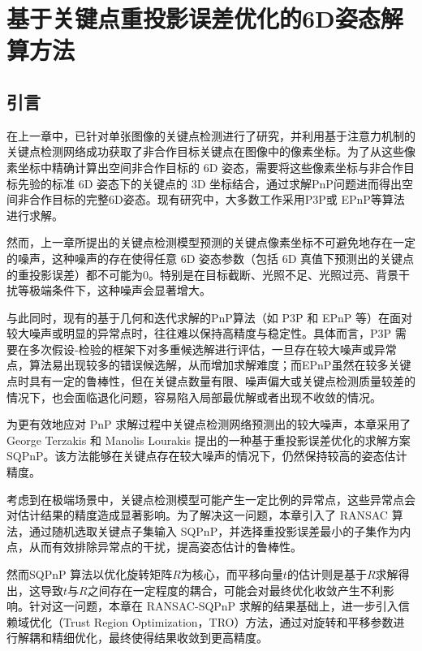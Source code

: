 
\chapter{基于关键点重投影误差优化的6D姿态解算方法}
\label{chap:RANSAC-TRO-SQPnP}

\section{引言}
\label{sec:RANSAC-TRO-SQPnP:intro}
在上一章中，已针对单张图像的关键点检测进行了研究，并利用基于注意力机制的关键点检测网络成功获取了非合作目标关键点在图像中的像素坐标。为了从这些像素坐标中精确计算出空间非合作目标的 6D 姿态，需要将这些像素坐标与非合作目标先验的标准 6D 姿态下的关键点的 3D 坐标结合，通过求解PnP问题进而得出空间非合作目标的完整6D姿态。现有研究中，大多数工作采用P3P\cite{chen2019satellite,s22218541,Guo_2022}或 EPnP\cite{li2022learning,huan2020pose,lotti2022investigating}等算法进行求解。

然而，上一章所提出的关键点检测模型预测的关键点像素坐标不可避免地存在一定的噪声，这种噪声的存在使得任意 6D 姿态参数（包括 6D 真值下预测出的关键点的重投影误差）都不可能为0。特别是在目标截断、光照不足、光照过亮、背景干扰等极端条件下，这种噪声会显著增大。

与此同时，现有的基于几何和迭代求解的PnP算法（如 P3P 和 EPnP 等）在面对较大噪声或明显的异常点时，往往难以保持高精度与稳定性。具体而言，P3P 需要在多次假设-检验的框架下对多重候选解进行评估，一旦存在较大噪声或异常点，算法易出现较多的错误候选解，从而增加求解难度；而EPnP虽然在较多关键点时具有一定的鲁棒性，但在关键点数量有限、噪声偏大或关键点检测质量较差的情况下，也会面临退化问题，容易陷入局部最优解或者出现不收敛的情况。

为更有效地应对 PnP 求解过程中关键点检测网络预测出的较大噪声，本章采用了 George Terzakis 和 Manolis Lourakis 提出的一种基于重投影误差优化的求解方案 SQPnP\cite{terzakis2020consistently}。该方法能够在关键点存在较大噪声的情况下，仍然保持较高的姿态估计精度。

考虑到在极端场景中，关键点检测模型可能产生一定比例的异常点，这些异常点会对估计结果的精度造成显著影响。为了解决这一问题，本章引入了 RANSAC 算法，通过随机选取关键点子集输入 SQPnP，并选择重投影误差最小的子集作为内点，从而有效排除异常点的干扰，提高姿态估计的鲁棒性。

然而SQPnP 算法以优化旋转矩阵$R$为核心，而平移向量$t$的估计则是基于$R$求解得出，这导致$t$与$R$之间存在一定程度的耦合，可能会对最终优化收敛产生不利影响。针对这一问题，本章在 RANSAC-SQPnP 求解的结果基础上，进一步引入信赖域优化（Trust Region Optimization，TRO）方法，通过对旋转和平移参数进行解耦和精细优化，最终使得结果收敛到更高精度。


